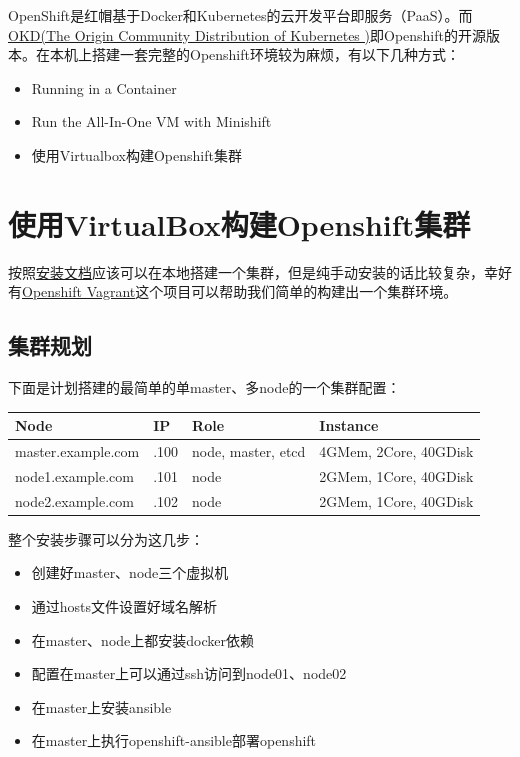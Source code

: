 \documentclass[12pt]{article}
\begin{document}
\makeblogtitle

OpenShift是红帽基于Docker和Kubernetes的云开发平台即服务（PaaS）。而\href{https://www.okd.io/}{OKD(The Origin Community Distribution of Kubernetes )}即Openshift的开源版本。在本机上搭建一套完整的Openshift环境较为麻烦，有以下几种方式：

\begin{itemize}
\tightlist
\item
  Running in a Container
\item
  Run the All-In-One VM with Minishift
\item
  使用Virtualbox构建Openshift集群
\end{itemize}

\section{使用VirtualBox构建Openshift集群}\label{ux4f7fux7528virtualboxux6784ux5efaopenshiftux96c6ux7fa4}

按照\href{https://docs.openshift.com/container-platform/3.11/install/index.html}{安装文档}应该可以在本地搭建一个集群，但是纯手动安装的话比较复杂，幸好有\href{https://github.com/eliu/openshift-vagrant}{Openshift Vagrant}这个项目可以帮助我们简单的构建出一个集群环境。

\subsection{集群规划}\label{ux96c6ux7fa4ux89c4ux5212}

下面是计划搭建的最简单的单master、多node的一个集群配置：

{\def\LTcaptype{none} %
\begin{longtable}[]{@{}llll@{}}
\toprule\noalign{}
Node & IP & Role & Instance \\
\midrule\noalign{}
\endhead
\bottomrule\noalign{}
\endlastfoot
master.example.com & .100 & node, master, etcd & 4GMem, 2Core, 40GDisk \\
node1.example.com & .101 & node & 2GMem, 1Core, 40GDisk \\
node2.example.com & .102 & node & 2GMem, 1Core, 40GDisk \\
\end{longtable}
}

整个安装步骤可以分为这几步：

\begin{itemize}
\tightlist
\item
  创建好master、node三个虚拟机
\item
  通过hosts文件设置好域名解析
\item
  在master、node上都安装docker依赖
\item
  配置在master上可以通过ssh访问到node01、node02
\item
  在master上安装ansible
\item
  在master上执行openshift-ansible部署openshift
\end{itemize}
\end{document}
